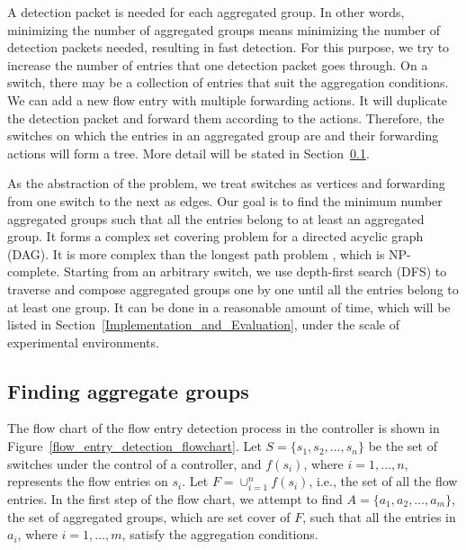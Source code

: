 A detection packet is needed for each aggregated group. In other words, minimizing the number of aggregated groups means minimizing the number of detection packets needed, resulting in fast detection. For this purpose, we try to increase the number of entries that one detection packet goes through. On a switch, there may be a collection of entries that suit the aggregation conditions. We can add a new flow entry with multiple forwarding actions. It will duplicate the detection packet and forward them according to the actions. Therefore, the switches on which the entries in an aggregated group are and their forwarding actions will form a tree. More detail will be stated in Section~\ref{Aggregated_group_finding}.

As the abstraction of the problem, we treat switches as vertices and forwarding from one switch to the next as edges. Our goal is to find the minimum number aggregated groups such that all the entries belong to at least an aggregated group. It forms a complex set covering problem for a directed acyclic graph (DAG). It is more complex than the longest path problem \cite{DMR97,RU04}, which is NP-complete. Starting from an arbitrary switch, we use depth-first search (DFS) to traverse and compose aggregated groups one by one until all the entries belong to at least one group. It can be done in a reasonable amount of time, which will be listed in Section~\ref{Implementation_and_Evaluation}, under the scale of experimental environments.

\subsection{Finding aggregate groups}
\label{Aggregated_group_finding}

The flow chart of the flow entry detection process in the controller is shown in Figure~\ref{flow_entry_detection_flowchart}. Let $S=\{s_1,s_2,\ldots,s_n\}$ be the set of switches under the control of a controller, and $f(s_i)$, where $i=1,\ldots,n$, represents the flow entries on $s_i$. Let $F=\cup_{i=1}^n f(s_i)$, i.e., the set of all the flow entries. In the first step of the flow chart, we attempt to find $A=\{a_1, a_2, \ldots, a_m\}$, the set of aggregated groups, which are set cover of $F$, such that all the entries in $a_i$, where $i=1,\ldots,m$, satisfy the aggregation conditions.

